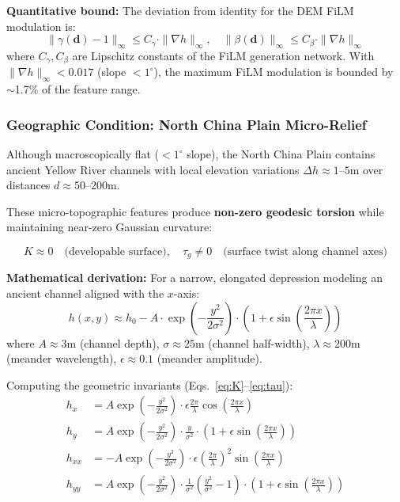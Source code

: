 \textbf{Quantitative bound:} The deviation from identity for the DEM
FiLM modulation is:
\begin{equation}
    \|\gamma(\mathbf{d}) - 1\|_\infty \leq C_\gamma \cdot \|\nabla h\|_\infty, \quad
    \|\beta(\mathbf{d})\|_\infty \leq C_\beta \cdot \|\nabla h\|_\infty
\end{equation}
where $C_\gamma, C_\beta$ are Lipschitz constants of the FiLM generation
network. With $\|\nabla h\|_\infty < 0.017$ (slope $<1^\circ$), the maximum
FiLM modulation is bounded by $\sim$1.7\% of the feature range.

\subsubsection{Geographic Condition: North China Plain Micro-Relief}

Although macroscopically flat ($<1^\circ$ slope), the North China Plain
contains ancient Yellow River channels with local elevation variations
$\Delta h \approx 1\text{--}5\text{m}$ over distances $d \approx 50\text{--}200\text{m}$.

These micro-topographic features produce \textbf{non-zero geodesic torsion}
while maintaining near-zero Gaussian curvature:

\begin{equation}\label{eq:ncp-micro}
    K \approx 0 \quad \text{(developable surface)}, \quad
    \tau_g \neq 0 \quad \text{(surface twist along channel axes)}
\end{equation}

\textbf{Mathematical derivation:} For a narrow, elongated depression
modeling an ancient channel aligned with the $x$-axis:
\begin{equation}
    h(x,y) \approx h_0 - A \cdot \exp\left(-\frac{y^2}{2\sigma^2}\right)
    \cdot \left(1 + \epsilon \sin\left(\frac{2\pi x}{\lambda}\right)\right)
\end{equation}
where $A \approx 3\text{m}$ (channel depth), $\sigma \approx 25\text{m}$
(channel half-width), $\lambda \approx 200\text{m}$ (meander wavelength),
$\epsilon \approx 0.1$ (meander amplitude).

Computing the geometric invariants (Eqs.~\ref{eq:K}--\ref{eq:tau}):
\begin{align}
    h_x &= A \exp\left(-\frac{y^2}{2\sigma^2}\right) \cdot
        \epsilon \frac{2\pi}{\lambda} \cos\left(\frac{2\pi x}{\lambda}\right) \\
    h_y &= A \exp\left(-\frac{y^2}{2\sigma^2}\right) \cdot
        \frac{y}{\sigma^2} \cdot \left(1 + \epsilon \sin\left(\frac{2\pi x}{\lambda}\right)\right) \\
    h_{xx} &= -A \exp\left(-\frac{y^2}{2\sigma^2}\right) \cdot
        \epsilon \left(\frac{2\pi}{\lambda}\right)^2
        \sin\left(\frac{2\pi x}{\lambda}\right) \\
    h_{yy} &= A \exp\left(-\frac{y^2}{2\sigma^2}\right) \cdot
        \frac{1}{\sigma^2}\left(\frac{y^2}{\sigma^2} - 1\right) \cdot
        \left(1 + \epsilon \sin\left(\frac{2\pi x}{\lambda}\right)\right)
\end{align}


